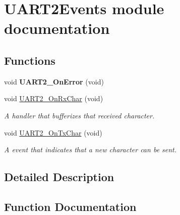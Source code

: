 \hypertarget{group___u_a_r_t2_events__module}{}\section{U\+A\+R\+T2\+Events module documentation}
\label{group___u_a_r_t2_events__module}
\subsection*{Functions}
\begin{DoxyCompactItemize}
\item 
\mbox{\label{group___u_a_r_t2_events__module_ga6b6964587856f09671e7f78c59a12253}} 
void {\bfseries U\+A\+R\+T2\+\_\+\+On\+Error} (void)
\item 
void \hyperlink{group___u_a_r_t2_events__module_ga078123b02e15a2d43e308b5765a943cd}{U\+A\+R\+T2\+\_\+\+On\+Rx\+Char} (void)
\begin{DoxyCompactList}\small\item\em A handler that bufferizes that received character. \end{DoxyCompactList}\item 
void \hyperlink{group___u_a_r_t2_events__module_gac49d0823b6d0e433817f45c9df0a688e}{U\+A\+R\+T2\+\_\+\+On\+Tx\+Char} (void)
\begin{DoxyCompactList}\small\item\em A event that indicates that a new character can be sent. \end{DoxyCompactList}\end{DoxyCompactItemize}


\subsection{Detailed Description}


\subsection{Function Documentation}
\mbox{\label{group___u_a_r_t2_events__module_ga078123b02e15a2d43e308b5765a943cd}} 
